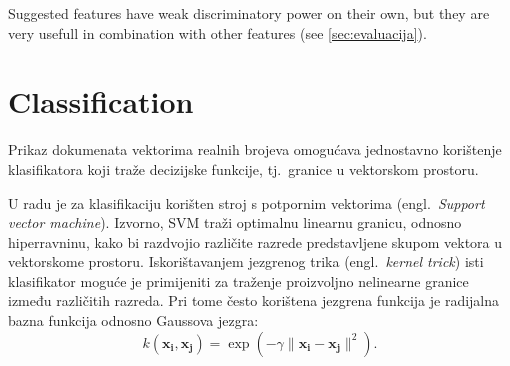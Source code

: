\documentclass[11pt,english]{article}
\newcommand{\engl}[1]{(engl.~\emph{#1})}
\begin{document}
\begin{multicols}{2}
Suggested features have weak discriminatory power on their own, but they are
very usefull in combination with other features (see \ref{sec:evaluacija}).

\section{Classification}
Prikaz dokumenata vektorima realnih brojeva omogućava jednostavno korištenje
klasifikatora koji traže decizijske funkcije, tj.\ granice u vektorskom
prostoru.


U radu je za klasifikaciju korišten stroj s potpornim vektorima \engl{Support
vector machine}. Izvorno, SVM traži optimalnu linearnu granicu, odnosno
hiperravninu, kako bi razdvojio različite razrede predstavljene skupom vektora u
vektorskome prostoru. Iskorištavanjem jezgrenog trika \engl{kernel trick} isti
klasifikator moguće je primijeniti za traženje proizvoljno nelinearne granice
između različitih razreda. Pri tome često korištena jezgrena funkcija je
radijalna bazna funkcija odnosno Gaussova jezgra:
\begin{equation}
k(\mathbf{x_i},\mathbf{x_j})=\exp(-\gamma \|\mathbf{x_i} - \mathbf{x_j}\|^2).
\end{equation}


\end{multicols}
\end{document}

